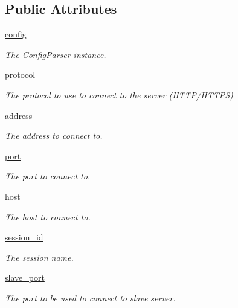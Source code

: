 \subsection*{\-Public \-Attributes}
\begin{DoxyCompactItemize}
\item 
\hyperlink{classpyrtai_1_1configurator_1_1_configurator_ae42c9eb42092cf27af6c48236b61eefd}{config}
\begin{DoxyCompactList}\small\item\em \-The \-Config\-Parser instance. \end{DoxyCompactList}\item 
\hyperlink{classpyrtai_1_1configurator_1_1_configurator_a9ff2397a8a72f28ee03fc9100e1f4417}{protocol}
\begin{DoxyCompactList}\small\item\em \-The protocol to use to connect to the server (\-H\-T\-T\-P/\-H\-T\-T\-P\-S) \end{DoxyCompactList}\item 
\hyperlink{classpyrtai_1_1configurator_1_1_configurator_a884de51005a6b3daa58935e55b401007}{address}
\begin{DoxyCompactList}\small\item\em \-The address to connect to. \end{DoxyCompactList}\item 
\hyperlink{classpyrtai_1_1configurator_1_1_configurator_a23c3696bef9aa98f3fccd2a855ef62bb}{port}
\begin{DoxyCompactList}\small\item\em \-The port to connect to. \end{DoxyCompactList}\item 
\hyperlink{classpyrtai_1_1configurator_1_1_configurator_af98f7cb1e0a1cb7295780106e675643c}{host}
\begin{DoxyCompactList}\small\item\em \-The host to connect to. \end{DoxyCompactList}\item 
\hyperlink{classpyrtai_1_1configurator_1_1_configurator_acf7ca48f9329be8ff83e4846bbb252f9}{session\-\_\-id}
\begin{DoxyCompactList}\small\item\em \-The session name. \end{DoxyCompactList}\item 
\hyperlink{classpyrtai_1_1configurator_1_1_configurator_a7040ca7952d5959b2248250c43d77762}{slave\-\_\-port}
\begin{DoxyCompactList}\small\item\em \-The port to be used to connect to slave server. \end{DoxyCompactList}\item 

\end{DoxyCompactItemize}
